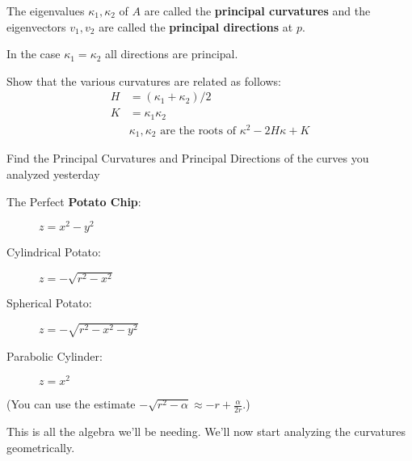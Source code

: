 \begin{definition}
	The eigenvalues $ \kappa_1, \kappa_2$ of $ A$ are called the \textbf{principal curvatures} and the eigenvectors $ v_1, v_2$ are called the \textbf{principal directions} at $p$.
\end{definition}
\begin{remark}
	In the case $ \kappa_1 = \kappa_2$ all directions are principal.
\end{remark}
\begin{ques}
	Show that the various curvatures are related as follows:
	\begin{align}
		\nonumber H &= (\kappa_1 + \kappa_2)/2 \\
		\nonumber K &= \kappa_1 \kappa_2 \\
			\label{eq:eigenvalues}
		&\kappa_1, \kappa_2 \mbox{ are the roots of } \kappa^2 - 2H \kappa + K
	\end{align}
\end{ques}
\begin{ques}
	Find the Principal Curvatures and Principal Directions of the curves you analyzed yesterday
	\begin{description}
		\item[The Perfect \textbf{Potato Chip}: ]  $ z = x^2 - y^2 $
		\item[Cylindrical Potato: ] $z = -\sqrt{r^2 - x^2} $
		\item[Spherical Potato: ] $z = -\sqrt{r^2 - x^2 - y^2}$
		\item[Parabolic Cylinder: ] $z =  x^2$
	\end{description}
	(You can use the estimate $-\sqrt{r^2 - \alpha} \approx -r + \frac{\alpha}{2r} $.)
\end{ques}
\noindent This is all the algebra we'll be needing. We'll now start analyzing the curvatures geometrically.



